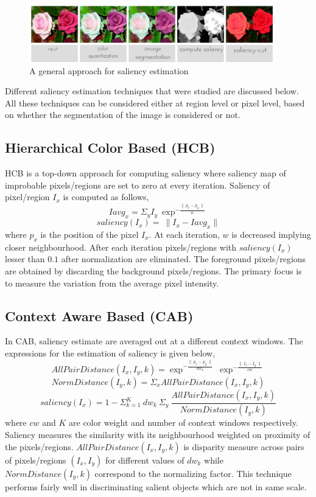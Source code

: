 \begin{figure}[htpb]
   \begin{center}
	    \includegraphics[width=0.95\textwidth]{snaps/sal/saliency.eps}     
     \caption {A general approach for saliency estimation}
   \label{fig:salap}
   \end{center}
 \end{figure}

\par Different saliency estimation techniques that were studied are discussed below.  All these techniques can be considered either at region level or pixel level, based on whether the segmentation of the image is considered or not.

\subsection{Hierarchical Color Based (HCB)}
HCB is a top-down approach for computing saliency where saliency map of improbable pixels/regions are set to zero at every iteration.  Saliency of pixel/region $I_{x}$ is computed as follows,
$$ Iavg_{x} = \Sigma_{y} I_{y}~\exp^{-\frac{\parallel~p_{x} - p_{y}~\parallel}{w}}  $$
$$ saliency(I_{x}) =~\parallel I_{x} - Iavg_{x} \parallel $$
where $p_{x}$ is the position of the pixel $I_{x}$.  At each iteration, $w$ is decreased implying closer neighbourhood.  After each iteration pixels/regions with $ saliency(I_{x})$ lesser than $0.1$ after normalization are eliminated.  The foreground pixels/regions are obtained by discarding the background pixels/regions.  The primary focus is to measure the variation from the average pixel intensity.

\subsection{Context Aware Based (CAB)}
In CAB, saliency estimate are averaged out at a different context windows.  The expressions for the estimation of saliency is given below,
$$ AllPairDistance(I_{x},I_{y},k) = \exp^{-\frac{\parallel~p_x - p_y~\parallel}{dw_k}}~\exp^{-\frac{\parallel~I_{x} - I_{y}~\parallel}{cw}}$$
$$ NormDistance(I_{y},k) = \Sigma_{x} AllPairDistance(I_{x},I_{y},k)$$
$$ saliency(I_{x}) = 1- \Sigma^{K}_{k=1}~dw_{k}~\Sigma_{y}~\frac{AllPairDistance(I_{x},I_{y},k)}{NormDistance(I_{y},k)}$$
where $cw$ and $K$ are color weight and number of context windows respectively.  Saliency measures the similarity with its neighbourhood weighted on proximity of the pixels/regions. $AllPairDistance(I_{x},I_{y},k)$ is disparity measure across pairs of pixels/regions $(I_{x},I_{y})$ for different values of $dw_{k}$ while $NormDistance(I_{y},k)$ correspond to the normalizing factor. This technique performs fairly well in discriminating salient objects which are not in same scale.

